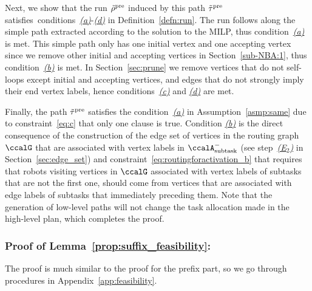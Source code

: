 \documentclass[Afour,sageh,times]{sagej}
\newcommand{\auto}[1]{\ccalA_{\textup{#1}}}
\begin{document}
{{Next, we show that the run $\tilde{\rho}^{\textup{pre}}$ induced by this path $\tilde{\tau}^{\textup{pre}}$ satisfies~conditions~\hyperref[cond:a]{\it (a)}-\hyperref[cond:d]{\it (d)} in Definition~\ref{defn:run}. The run  follows along the simple path extracted according to the solution to the MILP, thus condition~\hyperref[cond:a]{\it (a)} is met. This simple path only has one initial vertex and one accepting vertex since we remove other initial and accepting vertices in Section~\ref{sub-NBA:1}, thus condition~\hyperref[cond:b]{\it (b)} is met. In Section~\ref{sec:prune} we remove vertices that do not self-loops except initial and accepting vertices, and  edges that do not strongly imply their end vertex labels, hence conditions~\hyperref[cond:c]{\it (c)} and \hyperref[cond:d]{\it (d)} are  met.

Finally, the path $\tilde{\tau}^{\textup{pre}}$ satisfies the condition~\hyperref[asmp:a]{\it (a)} in Assumption~\ref{asmp:same} due to constraint~\eqref{eq:c} that only one clause is true.  Condition \hyperref[asmp:b]{\it (b)} is the direct consequence of the construction of the edge set of vertices in the routing graph $\ccalG$ that are associated with vertex labels in $\auto{subtask}^-$ (see step~\hyperref[edge:vertex2]{\it (E$_2$)} in Section~\ref{sec:edge_set}) and constraint~\eqref{eq:routingforactivation_b} that requires that robots visiting vertices in $\ccalG$  associated with vertex labels of subtasks that are not the first one, should come from vertices that are associated with edge labels of  subtasks that immediately preceding them. Note that the generation of low-level paths will not change the task allocation made in the high-level plan, which completes the proof.

\subsubsection{Proof of Lemma~\ref{prop:suffix_feasibility}:}\label{app:suffix_feasibility}
The proof is much similar to the proof for the prefix part, so we go through procedures in Appendix~\ref{app:feasibility}.

}}
\end{document}
